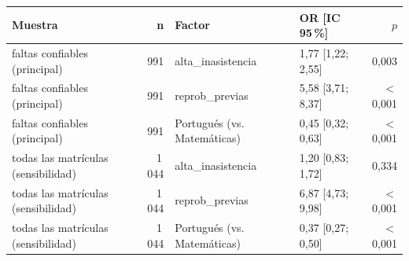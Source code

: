 \begin{tabular}{lrllr}
\toprule
Muestra & n & Factor & OR [IC 95\,\%] & $p$ \\
\midrule
faltas confiables (principal) & 991 & alta\_inasistencia & 1,77 [1,22; 2,55] & 0,003 \\
faltas confiables (principal) & 991 & reprob\_previas & 5,58 [3,71; 8,37] & $<$0,001 \\
faltas confiables (principal) & 991 & Portugués (vs. Matemáticas) & 0,45 [0,32; 0,63] & $<$0,001 \\
todas las matrículas (sensibilidad) & 1\,044 & alta\_inasistencia & 1,20 [0,83; 1,72] & 0,334 \\
todas las matrículas (sensibilidad) & 1\,044 & reprob\_previas & 6,87 [4,73; 9,98] & $<$0,001 \\
todas las matrículas (sensibilidad) & 1\,044 & Portugués (vs. Matemáticas) & 0,37 [0,27; 0,50] & $<$0,001 \\
\bottomrule
\end{tabular}
